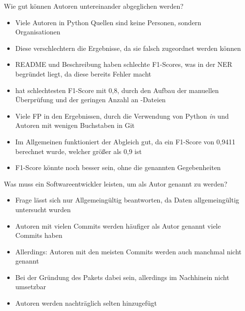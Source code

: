 \documentclass[%
    handout,
    aspectratio=1610,
    10pt,
    onlytextwidth, %
]{beamer}
\begin{document}
\begin{frame}{Wie gut können Autoren untereinander abgeglichen werden?}
    \begin{itemize}
        \item Viele Autoren in Python Quellen sind keine Personen, sondern Organisationen
        \item Diese verschlechtern die Ergebnisse, da sie falsch zugeordnet werden können
        \item README und Beschreibung haben schlechte F1-Scores, was in der NER begründet liegt, da diese bereits Fehler macht
        \item {} hat schlechtesten F1-Score mit 0,8, durch den Aufbau der manuellen Überprüfung und der geringen Anzahl an -Dateien
        \item Viele FP in den Ergebnissen, durch die Verwendung von Python \emph{in} und Autoren mit wenigen Buchstaben in Git
        \item Im Allgemeinen funktioniert der Abgleich gut, da ein F1-Score von 0,9411 berechnet wurde, welcher größer als 0,9 ist
        \item F1-Score könnte noch besser sein, ohne die genannten Gegebenheiten
    \end{itemize}
\end{frame}

\begin{frame}{Was muss ein Softwareentwickler leisten, um als Autor genannt zu werden?}
    \begin{itemize}
        \item Frage lässt sich nur Allgemeingültig beantworten, da Daten allgemeingültig untersucht wurden
        \item Autoren mit vielen Commits werden häufiger als Autor genannt \rightarrow{} viele Commits haben
        \item Allerdings: Autoren mit den meisten Commits werden auch manchmal nicht genannt
        \item Bei der Gründung des Pakets dabei sein, allerdings im Nachhinein nicht umsetzbar
        \item Autoren werden nachträglich selten hinzugefügt %
    \end{itemize}
\end{frame}
\end{document}

